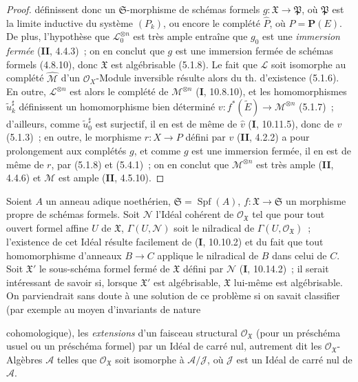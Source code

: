 \begin{proof}
définissent donc un $\mathfrak S$-morphisme de schémas formels
$g:\mathfrak X\to\mathfrak P$, où $\mathfrak P$ est la limite inductive du
système $(P_k)$, ou encore le complété $\widehat P$, où $P=\mathbf P(E)$. De
plus, l'hypothèse que $\mathcal L_0^{\otimes n}$ est très ample entraîne que
$g_0$ est une \emph{immersion fermée} (\textbf{II}, 4.4.3)~; on en conclut que $g$ est une
immersion fermée de schémas formels (4.8.10), donc $\mathfrak X$ est
algébrisable (5.1.8). Le fait que $\mathcal L$ soit isomorphe au complété
$\widehat{\mathcal M}$ d'un $\mathcal O_X$-Module inversible résulte alors du
th. d'existence (5.1.6). En outre, $\mathcal L^{\otimes n}$ est alors le
complété de $\mathcal M^{\otimes n}$ (\textbf{I}, 10.8.10), et les homomorphismes
$\widetilde u_k^\sharp$ définissent un homomorphisme bien déterminé
$v:f^*(\widetilde E)\longrightarrow\mathcal M^{\otimes n}$
(5.1.7)~; d'ailleurs, comme $\widetilde u_0^\sharp$ est surjectif, il en est de
même de $\widehat v$ (\textbf{I}, 10.11.5), donc de $v$ (5.1.3)~; en outre, le morphisme
$r:X\to P$ défini par $v$ (\textbf{II}, 4.2.2) a pour prolongement aux complétés $g$,
et comme $g$ est une immersion fermée, il en est de même de $r$, par (5.1.8)
et (5.4.1)~; on en conclut que $\mathcal M^{\otimes n}$ est très ample
(\textbf{II}, 4.4.6) et $\mathcal M$ est ample (\textbf{II}, 4.5.10).
\end{proof}

\begin{remark}[5.4.6]
\label{III.5.4.6-fr}
Soient $A$ un anneau adique noethérien,
$\mathfrak S=\operatorname{Spf}(A)$,
$f:\mathfrak X\to\mathfrak S$ un morphisme propre de schémas formels. Soit
$\mathcal N$ l'Idéal cohérent de $\mathcal O_{\mathfrak X}$ tel que pour tout
ouvert formel affine $U$ de $\mathfrak X$, $\Gamma(U,\mathcal N)$ soit le
nilradical de $\Gamma(U,\mathcal O_{\mathfrak X})$~; l'existence de cet Idéal
résulte facilement de (\textbf{I}, 10.10.2) et du fait que tout homomorphisme d'anneaux
$B\to C$ applique le nilradical de $B$ dans celui de $C$. Soit
$\mathfrak X'$ le sous-schéma formel fermé de $\mathfrak X$ défini par
$\mathcal N$ (\textbf{I}, 10.14.2)~; il serait intéressant de savoir si, lorsque
$\mathfrak X'$ est algébrisable, $\mathfrak X$ lui-même est algébrisable. On
parviendrait sans doute à une solution de ce problème si on savait classifier
(par exemple au moyen d'invariants de nature


cohomologique), les \emph{extensions} d'un faisceau structural
$\mathcal O_{\mathfrak X}$ (pour un préschéma usuel ou un préschéma formel) par
un Idéal de carré nul, autrement dit les $\mathcal O_{\mathfrak X}$-Algèbres
$\mathcal A$ telles que $\mathcal O_{\mathfrak X}$ soit isomorphe à
$\mathcal A/\mathcal J$, où $\mathcal J$ est un Idéal de carré nul de
$\mathcal A$.
\end{remark}

